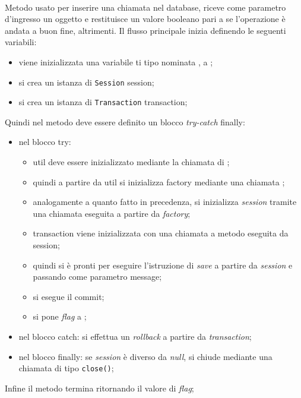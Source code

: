 \begin{description}
	\item{}\\
	Metodo usato per inserire una chiamata nel database, riceve come parametro d'ingresso un oggetto  e restituisce un valore booleano  pari a  se l'operazione è andata a buon fine,  altrimenti. Il flusso principale inizia definendo le seguenti variabili:
	\begin{itemize}
		\item viene inizializzata una variabile ti tipo  nominata , a ;
		\item si crea un istanza di \texttt{Session} session;
		\item si crea un istanza di \texttt{Transaction} transaction;
	\end{itemize}
	Quindi nel metodo deve essere definito un blocco \textit{try-catch} finally:
	\begin{itemize}
		\item nel blocco try:
		\begin{itemize}
			\item util deve essere inizializzato mediante la chiamata  di ;
			\item quindi a partire da util si inizializza factory mediante una chiamata ;
			\item analogamente a quanto fatto in precedenza, si inizializza \textit{session} tramite una chiamata  eseguita a partire da \textit{factory};
			\item transaction viene inizializzata con una chiamata a metodo  eseguita da session;
			\item quindi si è pronti per eseguire l'istruzione di \textit{save} a partire da \textit{session} e passando come parametro message;
			\item si esegue il commit;
			\item si pone \textit{flag} a ;
		\end{itemize}
		\item nel blocco catch: si effettua un \textit{rollback} a partire da \textit{transaction};
		\item nel blocco finally: se \textit{session} è diverso da \textit{null}, si chiude mediante una chiamata di tipo \texttt{close()};
	\end{itemize}
	Infine il metodo termina ritornando il valore di \textit{flag};
	

\end{description}
